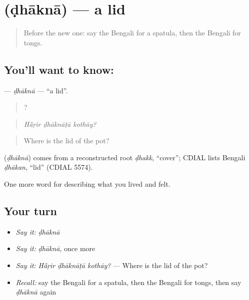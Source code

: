 \section[\texorpdfstring{\bn{ঢাকনা} (ḍhāknā)}{ঢাকনা (ḍhāknā)}]{ (ḍhāknā) — a lid}

\label{lesson:BN-C512-dhakna}



\begin{quote}
Before the new one: say the Bengali for a spatula, then the Bengali for tongs.
\end{quote}

\subsection*{You'll want to know: }
\textbf{} — \emph{ḍhāknā} — \textquotedblleft{}a lid\textquotedblright{}.

\begin{quote}
  ?
\end{quote}

\begin{quote}
\emph{Hā̃ṛir ḍhāknāṭā kothāy?}
\end{quote}

\begin{quote}
Where is the lid of the pot?
\end{quote}

\begin{cousinweb}
\textbf{} (\emph{ḍhāknā}) comes from a reconstructed root \emph{ḍhakk}, \textquotedblleft{}cover\textquotedblright{}; CDIAL lists Bengali \emph{ḍhākan}, \textquotedblleft{}lid\textquotedblright{} (CDIAL 5574).
\end{cousinweb}

\begin{grammarlens}[title={What you've built}]
One more word for describing what you lived and felt.
\end{grammarlens}

\subsection*{Your turn}
\begin{itemize}
\raggedright
  \item \emph{Say it:} \emph{ḍhāknā}
  \item \emph{Say it:} \emph{ḍhāknā}, once more
  \item \emph{Say it:} \emph{Hā̃ṛir ḍhāknāṭā kothāy?} — Where is the lid of the pot?
  \item \emph{Recall:} say the Bengali for a spatula, then the Bengali for tongs, then say \emph{ḍhāknā} again
\end{itemize}

